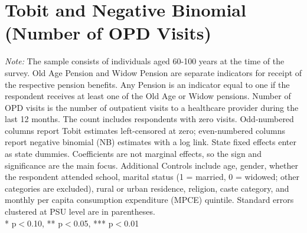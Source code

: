 \documentclass[
  11pt,
]{article}
\begin{document}
\section{Tobit and Negative Binomial (Number of OPD
Visits)}\label{tobit-and-negative-binomial-number-of-opd-visits}

\begin{table}[H]
\centering
\vspace{1.8mm}
\caption{Number of OPD Visits and Pension: Tobit and Negative Binomial Estimates}
\label{tab:opd_tobit_nb}
\vspace{3mm}
\vspace{2mm}
\begin{minipage}{0.95\textwidth}
\footnotesize \textit{Note:} The sample consists of individuals aged 60-100 years at the time of the survey. Old Age Pension and Widow Pension are separate indicators for receipt of the respective pension benefits. Any Pension is an indicator equal to one if the respondent receives at least one of the Old Age or Widow pensions. Number of OPD visits is the number of outpatient visits to a healthcare provider during the last 12 months. The count includes respondents with zero visits. Odd-numbered columns report Tobit estimates left-censored at zero; even-numbered columns report negative binomial (NB) estimates with a log link. State fixed effects enter as state dummies. Coefficients are not marginal effects, so the sign and significance are the main focus. Additional Controls include age, gender, whether the respondent attended school, marital status (1 = married, 0 = widowed; other categories are excluded), rural or urban residence, religion, caste category, and monthly per capita consumption expenditure (MPCE) quintile. Standard errors clustered at PSU level are in parentheses. \\ * p$<$0.10, ** p$<$0.05, *** p$<$0.01\\

\end{minipage}
\end{table}
\end{document}
